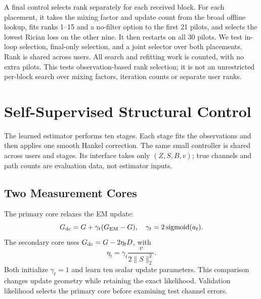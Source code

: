 \documentclass[10pt,journal,letterpaper]{IEEEtran}
\DeclareMathOperator{\sigmoid}{sigmoid}
\begin{document}
A final control selects rank separately for each received block. For each placement, it takes the mixing factor and update count from the broad offline lookup, fits ranks 1--15 and a no-filter option to the first 21 pilots, and selects the lowest Rician loss on the other nine. It then restarts on all 30 pilots. We test in-loop selection, final-only selection, and a joint selector over both placements. Rank is shared across users. All search and refitting work is counted, with no extra pilots. This tests observation-based rank selection; it is not an unrestricted per-block search over mixing factors, iteration counts or separate user ranks.

\section{Self-Supervised Structural Control}
\label{sec:learned}
The learned estimator performs ten stages. Each stage fits the observations and then applies one smooth Hankel correction. The same small controller is shared across users and stages. Its interface takes only $(Z,S,B,v)$; true channels and path counts are evaluation data, not estimator inputs.

\subsection{Two Measurement Cores}
The primary core relaxes the EM update:
\begin{equation}
 G_{\rm dc}=G+\gamma_t(G_{\rm EM}-G),\quad
 \gamma_t=2\sigmoid(a_t).
\end{equation}
The secondary core uses $G_{\rm dc}=G-2\eta_tD$, with
\begin{equation}
 \eta_t=\gamma_t\frac{v}{2\|S\|_2^2}.
\end{equation}
Both initialize $\gamma_t=1$ and learn ten scalar update parameters. This comparison changes update geometry while retaining the exact likelihood. Validation likelihood selects the primary core before examining test channel errors.
\end{document}

